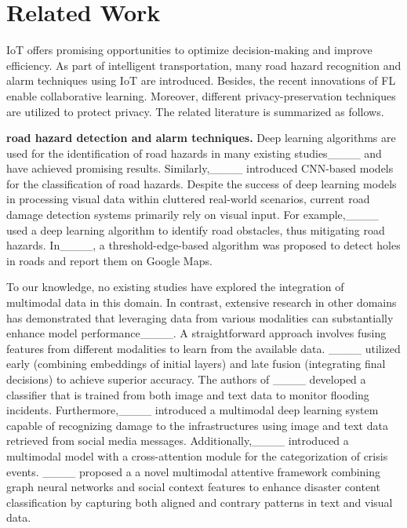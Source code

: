 \section{Related Work}
\label{sec:RelatedWork}
IoT offers promising opportunities to optimize decision-making and improve efficiency. As part of intelligent transportation, many road hazard recognition and alarm techniques using IoT are introduced. Besides, the recent innovations of FL enable collaborative learning. Moreover, different privacy-preservation techniques are utilized to protect privacy. The related literature is summarized as follows.

\textbf{road hazard detection and alarm techniques.}
Deep learning algorithms are used for the identification of road hazards in many existing studies____ and have achieved promising results. 
Similarly,____ introduced CNN-based models for the classification of road hazards. Despite the success of deep learning models in processing visual data within cluttered real-world scenarios, current road damage detection systems primarily rely on visual input. For example,____ used a deep learning algorithm to identify road obstacles, thus mitigating road hazards.
In____, a threshold-edge-based algorithm was proposed to detect holes in roads and report them on Google Maps.

To our knowledge, no existing studies have explored the integration of multimodal data in this domain. In contrast, extensive research in other domains has demonstrated that leveraging data from various modalities can substantially enhance model performance____. A straightforward approach involves fusing features from different modalities to learn from the available data. 
____ utilized early (combining embeddings of initial layers) and late fusion (integrating final decisions) to achieve superior accuracy. The authors of ____ developed a classifier that is trained from both image and text data to monitor flooding incidents. 
Furthermore,____ introduced a multimodal deep learning system capable of recognizing damage to the infrastructures using image and text data retrieved from social media messages. Additionally,____ introduced a multimodal model with a cross-attention module for the categorization of crisis events.
____ proposed a a novel multimodal attentive framework combining graph neural networks and social context features to enhance disaster content classification by capturing both aligned and contrary patterns in text and visual data.

